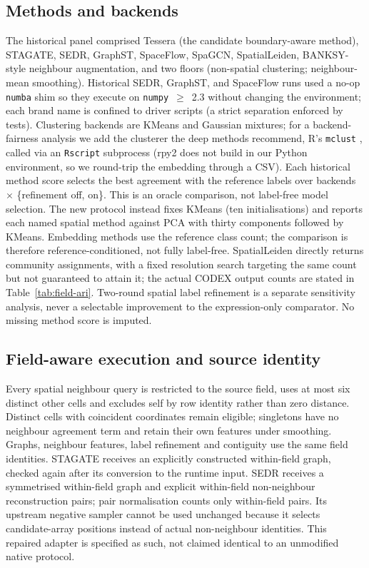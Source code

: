 \documentclass[journal]{IEEEtran}
\begin{document}
\subsection{Methods and backends}
The historical panel comprised Tessera (the candidate boundary-aware method),
STAGATE, SEDR, GraphST, SpaceFlow, SpaGCN, SpatialLeiden, BANKSY-style neighbour augmentation, and two
floors (non-spatial clustering; neighbour-mean smoothing). Historical SEDR, GraphST, and SpaceFlow runs used a no-op
\texttt{numba} shim so they execute on \texttt{numpy}~$\geq$~2.3 without changing the environment; each
brand name is confined to driver scripts (a strict separation enforced by tests). Clustering backends are
KMeans \citep{macqueen1967kmeans} and Gaussian mixtures; for a backend-fairness analysis we add
the clusterer the deep methods recommend, R's \texttt{mclust} \citep{scrucca2016mclust}, called
via an \texttt{Rscript} subprocess (rpy2 does not build in our Python environment, so we round-trip
the embedding through a CSV). Each historical method score selects the best agreement with the reference labels over backends
$\times$ \{refinement off, on\}. This is an oracle comparison, not label-free model selection. The new protocol instead fixes KMeans (ten initialisations) and reports each named spatial method against PCA with thirty components followed by KMeans. Embedding methods use the reference class count; the comparison is therefore reference-conditioned, not fully label-free. SpatialLeiden directly returns community assignments, with a fixed resolution search targeting the same count but not guaranteed to attain it; the actual CODEX output counts are stated in Table~\ref{tab:field-ari}. Two-round spatial label refinement is a separate sensitivity analysis, never a selectable improvement to the expression-only comparator. No missing method score is imputed.

\subsection{Field-aware execution and source identity}
Every spatial neighbour query is restricted to the source field, uses at most six distinct other cells and excludes self by row identity rather than zero distance. Distinct cells with coincident coordinates remain eligible; singletons have no neighbour agreement term and retain their own features under smoothing. Graphs, neighbour features, label refinement and contiguity use the same field identities. STAGATE receives an explicitly constructed within-field graph, checked again after its conversion to the runtime input. SEDR receives a symmetrised within-field graph and explicit within-field non-neighbour reconstruction pairs; pair normalisation counts only within-field pairs. Its upstream negative sampler cannot be used unchanged because it selects candidate-array positions instead of actual non-neighbour identities. This repaired adapter is specified as such, not claimed identical to an unmodified native protocol.
\end{document}
